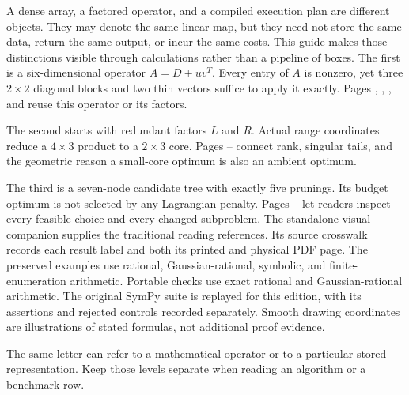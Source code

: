 A dense array, a factored operator, and a compiled execution plan are different objects. They may denote the same linear map, but they need not store the same data, return the same output, or incur the same costs. This guide makes those distinctions visible through calculations rather than a pipeline of boxes.
The first is a six-dimensional operator $A=D+uv^T$. Every entry of $A$ is nonzero, yet three $2\times2$ diagonal blocks and two thin vectors suffice to apply it exactly. Pages , , , and  reuse this operator or its factors.

The second starts with redundant factors $L$ and $R$. Actual range coordinates reduce a $4\times3$ product to a $2\times3$ core. Pages -- connect rank, singular tails, and the geometric reason a small-core optimum is also an ambient optimum.

The third is a seven-node candidate tree with exactly five prunings. Its budget optimum is not selected by any Lagrangian penalty. Pages -- let readers inspect every feasible choice and every changed subproblem.
The standalone visual companion supplies the traditional reading references. Its source crosswalk records each result label and both its printed and physical PDF page. The preserved examples use rational, Gaussian-rational, symbolic, and finite-enumeration arithmetic. Portable checks use exact rational and Gaussian-rational arithmetic. The original SymPy suite is replayed for this edition, with its assertions and rejected controls recorded separately. Smooth drawing coordinates are illustrations of stated formulas, not additional proof evidence.

The same letter can refer to a mathematical operator or to a particular stored representation. Keep those levels separate when reading an algorithm or a benchmark row.

